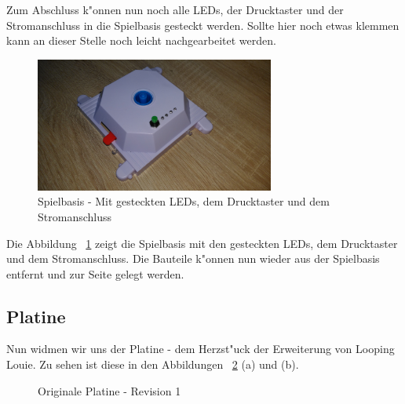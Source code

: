 Zum Abschluss k"onnen nun noch alle LEDs, der Drucktaster und der Stromanschluss in die Spielbasis gesteckt werden. Sollte hier noch etwas klemmen kann an dieser Stelle noch leicht nachgearbeitet werden.

\vspace{1cm}
\begin{figure}[!ht]
	\centering
  	\includegraphics[width=0.7\textwidth]{pictures/loolou_015.jpg}
	\caption{Spielbasis - Mit gesteckten LEDs, dem Drucktaster und dem Stromanschluss}
	\label{fig15}
\end{figure}
\vspace{0.5cm}

Die Abbildung ~\ref{fig15} zeigt die Spielbasis mit den gesteckten LEDs, dem Drucktaster und dem Stromanschluss. 
Die Bauteile k"onnen nun wieder aus der Spielbasis entfernt und zur Seite gelegt werden.

\newpage
\subsection{Platine}

Nun widmen wir uns der Platine - dem Herzst"uck der Erweiterung von Looping Louie. Zu sehen ist diese in den Abbildungen ~\ref{fig16} (a) und (b).

\vspace{1cm}
\begin{figure}[!ht]
	\centering
	\caption{Originale Platine - Revision 1}
	\label{fig16}
\end{figure}
\vspace{0.5cm}

